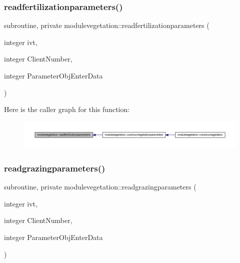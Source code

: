 \subsubsection{\texorpdfstring{readfertilizationparameters()}{readfertilizationparameters()}}
{\footnotesize\ttfamily subroutine, private modulevegetation\+::readfertilizationparameters (\begin{DoxyParamCaption}\item[{integer}]{ivt,  }\item[{integer}]{Client\+Number,  }\item[{integer}]{Parameter\+Obj\+Enter\+Data }\end{DoxyParamCaption})\hspace{0.3cm}{\ttfamily [private]}}

Here is the caller graph for this function\+:\nopagebreak
\begin{figure}[H]
\begin{center}
\leavevmode
\includegraphics[width=350pt]{namespacemodulevegetation_a5f1703a3712f12ee155098c63f043191_icgraph}
\end{center}
\end{figure}
\mbox{\label{namespacemodulevegetation_ac0d2b1971374eb7a2ded39cf56b0bd04}} 
\subsubsection{\texorpdfstring{readgrazingparameters()}{readgrazingparameters()}}
{\footnotesize\ttfamily subroutine, private modulevegetation\+::readgrazingparameters (\begin{DoxyParamCaption}\item[{integer}]{ivt,  }\item[{integer}]{Client\+Number,  }\item[{integer}]{Parameter\+Obj\+Enter\+Data }\end{DoxyParamCaption})\hspace{0.3cm}{\ttfamily [private]}}

